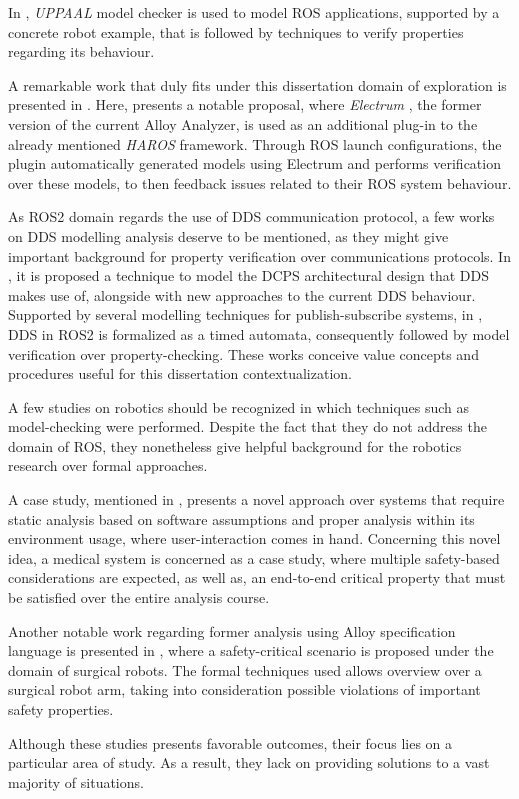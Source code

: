 In , \textit{UPPAAL} model checker is used to model ROS applications, supported by a concrete robot example, that is followed by techniques to verify properties regarding its behaviour. 

A remarkable work that duly fits under this dissertation domain of exploration is presented in . Here, \citeauthor{9341085} presents a notable proposal, where \textit{Electrum} \cite{lwspecification}, the former version of the current Alloy Analyzer, is used as an additional plug-in to the already mentioned \textit{HAROS} framework. Through ROS launch configurations, the plugin automatically generated models using Electrum and performs verification over these models, to then feedback issues related to their ROS system behaviour.

As ROS2 domain regards the use of DDS communication protocol, a few works on DDS modelling analysis deserve to be mentioned, as they might give important background for property verification over communications protocols. In , it is proposed a technique to model the DCPS architectural design that DDS makes use of, alongside with new approaches to the current DDS behaviour. Supported by several modelling techniques for publish-subscribe systems, in , DDS in ROS2 is formalized as a timed automata, consequently followed by model verification over property-checking. These works conceive value concepts and procedures useful for this dissertation contextualization.

A few studies on robotics should be recognized in which techniques such as model-checking were performed. Despite the fact that they do not address the domain of ROS, they nonetheless give helpful background for the robotics research over formal approaches. 

A case study, mentioned in , presents a novel approach over systems that require static analysis based on software assumptions and proper analysis within its environment usage, where user-interaction comes in hand. Concerning this novel idea, a medical system is concerned as a case study, where multiple safety-based considerations are expected, as well as, an end-to-end critical property that must be satisfied over the entire analysis course. 

Another notable work regarding former analysis using Alloy specification language is presented in , where a safety-critical scenario is proposed under the domain of surgical robots. The formal techniques used allows overview over a surgical robot arm, taking into consideration possible violations of important safety properties. 

Although these studies presents favorable outcomes, their focus lies on a particular area of study. As a result, they lack on providing solutions to a vast majority of situations.